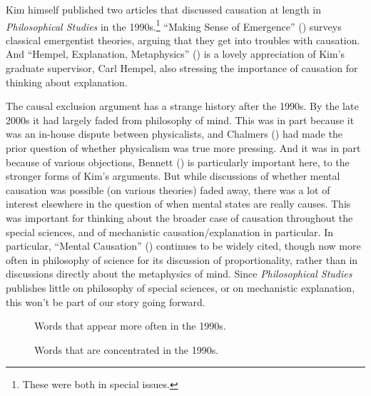 \documentclass[
  10pt,
  letterpaper,
  DIV=11,
  numbers=noendperiod,
  twoside]{scrartcl}
\begin{document}
Kim himself published two articles that discussed causation at length in
\emph{Philosophical Studies} in the 1990s.\footnote{These were both in
  special issues.} ``Making Sense of Emergence''
() surveys classical
emergentist theories, arguing that they get into troubles with
causation. And ``Hempel, Explanation, Metaphysics''
() is a lovely appreciation
of Kim's graduate supervisor, Carl Hempel, also stressing the importance
of causation for thinking about explanation.

The causal exclusion argument has a strange history after the 1990s. By
the late 2000s it had largely faded from philosophy of mind. This was in
part because it was an in-house dispute between physicalists, and
Chalmers () had made the prior question
of whether physicalism was true more pressing. And it was in part
because of various objections, Bennett
() is particularly important
here, to the stronger forms of Kim's arguments. But while discussions of
whether mental causation was possible (on various theories) faded away,
there was a lot of interest elsewhere in the question of when mental
states are really causes. This was important for thinking about the
broader case of causation throughout the special sciences, and of
mechanistic causation/explanation in particular. In particular, ``Mental
Causation'' () continues to
be widely cited, though now more often in philosophy of science for its
discussion of proportionality, rather than in discussions directly about
the metaphysics of mind. Since \emph{Philosophical Studies} publishes
little on philosophy of special sciences, or on mechanistic explanation,
this won't be part of our story going forward.

\begin{figure}


\caption{\label{fig-1990s-words-big}Words that appear more often in the
1990s.}

\end{figure}%

\begin{figure}


\caption{\label{fig-1990s-words-small}Words that are concentrated in the
1990s.}

\end{figure}%
\end{document}
